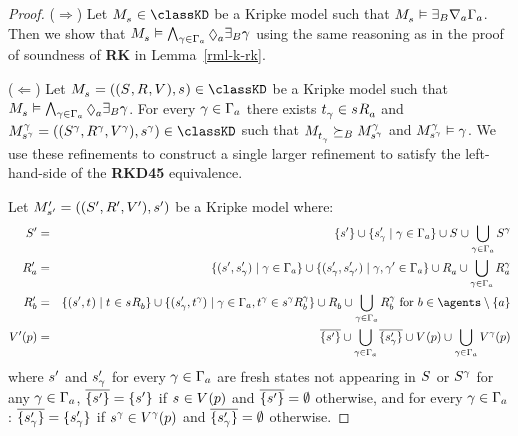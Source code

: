 \begin{proof}
($\Rightarrow$) Let $\kPModel{\kStateS} \in \classKD$ be a Kripke model such that $\kPModel{\kStateS} \entails \somerefsBs \coversA \Gamma_\agentA$.
Then we show that $\kPModel{\kStateS} \entails \bigwedge_{\gamma \in \Gamma_\agentA} \possibleA \somerefsBs \gamma$ using the same reasoning as in the proof of soundness of {\bf RK} in Lemma~\ref{rml-k-rk}.

($\Leftarrow$) Let $\kPModelAndTuple{\kStateS} \in \classKD$ be a Kripke model such that $\kPModel{\kStateS} \entails \bigwedge_{\gamma \in \Gamma_\agentA} \possibleA \somerefsBs \gamma$.
For every $\gamma \in \Gamma_\agentA$ there exists $\kStateT_\gamma \in \kSuccessorsA{\kStateS}$ and $\kPModelAndTuple[\gamma]{\kStateS[\gamma]} \in \classKD$ such that $\kPModel{\kStateT_\gamma} \simulatesBs \kPModel[\gamma]{\kStateS[\gamma]}$ and $\kPModel[\gamma]{\kStateS[\gamma]} \entails \gamma$.
We use these refinements to construct a single larger refinement to satisfy the left-hand-side of the {\bf RKD45} equivalence.

Let $\kPModelAndTupleP{\kStateSP}$ be a Kripke model where:
\begin{eqnarray*}
    \kStatesP &=& \{\kStateSP\} \cup \{\kStateSP_\gamma \mid \gamma \in \Gamma_\agentA\} \cup \kStates \cup \bigcup_{\gamma \in \Gamma_\agentA} \kStates[\gamma]\\
    \kAccessibilityPA &=& \{(\kStateSP, \kStateSP_\gamma) \mid \gamma \in \Gamma_\agentA\} \cup \{(\kStateSP_\gamma, \kStateSP_{\gamma'}) \mid \gamma, \gamma' \in \Gamma_\agentA\} \cup \kAccessibilityA \cup \bigcup_{\gamma \in \Gamma_\agentA} \kAccessibilityA[\gamma]\\
    \kAccessibilityPB &=& \{(\kStateSP, \kStateT) \mid \kStateT \in \kSuccessorsB{\kStateS}\} \cup \{(\kStateSP_\gamma, \kStateT[\gamma]) \mid \gamma \in \Gamma_\agentA, \kStateT[\gamma] \in \kSuccessorsB[\gamma]{\kStateS[\gamma]}\} \cup \kAccessibilityB \cup \bigcup_{\gamma \in \Gamma_\agentA} \kAccessibilityB[\gamma] \text{ for } \agentB \in \agents \setminus \{\agentA\}\\
    \kValuationP(\atomP) &=& \overline{\{\kStateSP\}} \cup \bigcup_{\gamma \in \Gamma_\agentA} \overline{\{\kStateSP_\gamma\}} \cup \kValuation(\atomP) \cup \bigcup_{\gamma \in \Gamma_\agentA} \kValuation[\gamma](\atomP)
\end{eqnarray*}
where $\kStateSP$ and $\kStateSP_\gamma$ for every $\gamma \in \Gamma_\agentA$ are fresh states not appearing in $\kStates$ or $\kStates[\gamma]$ for any $\gamma \in \Gamma_\agentA$, $\overline{\{\kStateSP\}} = \{\kStateSP\}$ if $\kStateS \in \kValuation(\atomP)$ and $\overline{\{\kStateSP\}} = \emptyset$ otherwise, and for every $\gamma \in \Gamma_\agentA$: $\overline{\{\kStateSP_\gamma\}} = \{\kStateSP_\gamma\}$ if $\kStateS[\gamma] \in \kValuation[\gamma](\atomP)$ and $\overline{\{\kStateSP_\gamma\}} = \emptyset$ otherwise.


\end{proof}
